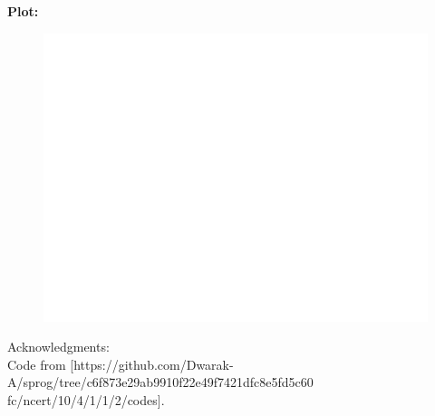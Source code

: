 \documentclass[journal]{IEEEtran}
\begin{document}
\newpage
\textbf{Plot:}
\begin{figure}[h]
   \centering
   \includegraphics[width=\columnwidth]{figs/fig.png}
\end{figure}


Acknowledgments:\\  
Code from [https://github.com/Dwarak-A/sprog/tree/c6f873e29ab9910f22e49f7421dfc8e5fd5c60
fc/ncert/10/4/1/1/2/codes].
\end{document}
